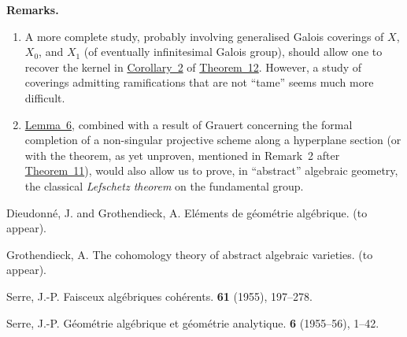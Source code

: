 \documentclass{article}
\newenvironment{rmenv}[1]
  {\phantomsection\par\medskip\noindent\textbf{#1.}\rmfamily}
  {\medskip}
\begin{document}
\begin{rmenv}{Remarks}
  \begin{enumerate}[1)]
    \item A more complete study, probably involving generalised Galois coverings of $X$, $X_0$, and $X_1$ (of eventually infinitesimal Galois group), should allow one to recover the kernel in \hyperref[theorem12corollary2]{Corollary~2} of \hyperref[theorem12]{Theorem~12}.
      However, a study of coverings admitting ramifications that are not ``tame'' seems much more difficult.
    \item \hyperref[lemma6]{Lemma~6}, combined with a result of Grauert concerning the formal completion of a non-singular projective scheme along a hyperplane section (or with the theorem, as yet unproven, mentioned in Remark~2 after \hyperref[theorem11]{Theorem~11}), would also allow us to prove, in ``abstract'' algebraic geometry, the classical \emph{Lefschetz theorem} on the fundamental group.
  \end{enumerate}
\end{rmenv}



\nocite{*}
\begin{thebibliography}{4}

  {\sc Dieudonn\'{e}, J. and Grothendieck, A.}
  \newblock El\'{e}ments de g\'{e}om\'{e}trie alg\'{e}brique.
   (to appear).

  {\sc Grothendieck, A.}
  \newblock The cohomology theory of abstract algebraic varieties.
   (to appear).

  {\sc Serre, J.-P.}
  \newblock Faisceux alg\'{e}briques coh\'{e}rents.
   {\bf 61} (1955), 197--278.

  {\sc Serre, J.-P.}
  \newblock G\'{e}om\'{e}trie alg\'{e}brique et g\'{e}om\'{e}trie analytique.
   \textbf{6} (1955--56), 1--42.

\end{thebibliography}
\end{document}
